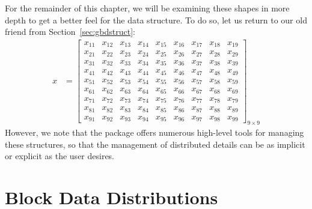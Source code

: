 For the remainder of this chapter, we will be examining these shapes in more depth to get a better feel for the data structure.  To do so, let us return to our old friend from Section~\ref{sec:gbdstruct}:\\
\begin{align*}
x &= \left[
      \begin{array}{lllllllll}
      x_{11} & x_{12} & x_{13} & x_{14} & x_{15} & x_{16} & x_{17} & x	_{18} & x_{19}\\
      x_{21} & x_{22} & x_{23} & x_{24} & x_{25} & x_{26} & x_{27} & x	_{28} & x_{29}\\
      x_{31} & x_{32} & x_{33} & x_{34} & x_{35} & x_{36} & x_{37} & x	_{38} & x_{39}\\
      x_{41} & x_{42} & x_{43} & x_{44} & x_{45} & x_{46} & x_{47} & x	_{48} & x_{49}\\
      x_{51} & x_{52} & x_{53} & x_{54} & x_{55} & x_{56} & x_{57} & x	_{58} & x_{59}\\
      x_{61} & x_{62} & x_{63} & x_{64} & x_{65} & x_{66} & x_{67} & x	_{68} & x_{69}\\
      x_{71} & x_{72} & x_{73} & x_{74} & x_{75} & x_{76} & x_{77} & x	_{78} & x_{79}\\
      x_{81} & x_{82} & x_{83} & x_{84} & x_{85} & x_{86} & x_{87} & x	_{88} & x_{89}\\
      x_{91} & x_{92} & x_{93} & x_{94} & x_{95} & x_{96} & x_{97} & x	_{98} & x_{99}
      \end{array}
\right]_{9\times 9}
\end{align*}
However, we note that the  package offers numerous high-level tools for managing these structures, so that the management of distributed details can be as implicit or explicit as the user desires.

\section{Block Data Distributions}

